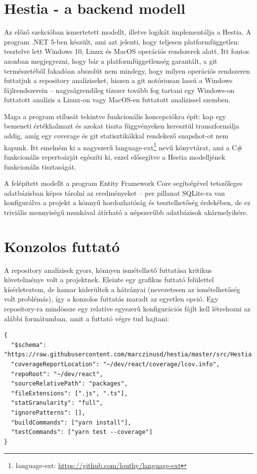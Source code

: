 \section{Hestia - a backend modell}

Az előző szekcióban ismertetett modellt, illetve logikát implementálja a Hestia. A program .NET 5-ben készült, ami azt jelenti, hogy teljesen platformfüggetlen: tesztelve lett Windows 10, Linux és MacOS operációs rendszerek alatt. Itt fontos azonban megjegyezni, hogy bár a platformfüggetlenség garantált, a git természetéből fakadóan abszolút nem mindegy, hogy milyen operációs rendszeren futtatjuk a repository analíziseket, hiszen a git notóriusan lassú a Windows fájlrendszerein -- nagyságrendileg tízszer tovább fog tartani egy Windows-on futtatott analízis a Linux-on vagy MacOS-en futtatott analízissel szemben.

Maga a program stílusát tekintve funkcionális koncepciókra épít: kap egy bemeneti értékhalmazt és azokat tiszta függvényeken keresztül transzformálja addig, amíg egy coverage és git statisztikákkal rendekező snapshot-ot nem kapunk. Itt emelném ki a nagyszerű language-ext\footnote{language-ext: \url{https://github.com/louthy/language-ext}} nevű könyvtárat, ami a C\# funkcionális repertoárját egészíti ki, ezzel elősegítve a Hestia modelljének funkcionális tisztaságát.

A felépített modellt a program Entity Framework Core segítségével tetszőleges adatbázisban képes tárolni az eredményeket -- per pillanat SQLite-ra van konfigurálva a projekt a könnyű hordozhatóság és tesztelhetőség érdekében, de ez triviális mennyiségű munkával átírható a népszerűbb adatbázisok akármelyikére.

\section{Konzolos futtató}

A repository analízisek gyors, könnyen ismételhető futtatása kritikus követelménye volt a projektnek. Eleinte egy grafikus futtató felülettel kísérleteztem, de hamar kiderültek a hátrányai (nevezetesen az ismételhetőség volt problémás), így a konzolos futtatás maradt az egyetlen opció. Egy repository-ra mindössze egy relatíve egyszerű konfigurációs fájlt kell létrehozni az alábbi formátumban, amit a futtató végre tud hajtani:

\begin{lstlisting}
{
  "$schema": "https://raw.githubusercontent.com/marczinusd/hestia/master/src/Hestia.ConsoleRunner/config.schema.json",
  "coverageReportLocation": "~/dev/react/coverage/lcov.info",
  "repoRoot": "~/dev/react",
  "sourceRelativePath": "packages",
  "fileExtensions": [".js", ".ts"],
  "statGranularity": "full",
  "ignorePatterns": [],
  "buildCommands": ["yarn install"],
  "testCommands": ["yarn test --coverage"]
}
\end{lstlisting}

